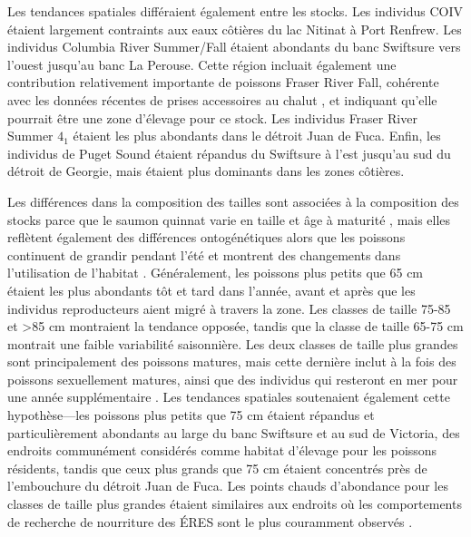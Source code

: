 Les tendances spatiales différaient également entre les stocks. Les individus COIV étaient largement contraints aux eaux côtières du lac Nitinat à Port Renfrew. Les individus Columbia River Summer/Fall étaient abondants du banc Swiftsure vers l'ouest jusqu'au banc La Perouse. Cette région incluait également une contribution relativement importante de poissons Fraser River Fall, cohérente avec les données récentes de prises accessoires au chalut \citep{lagasseReviewSalmonBycatch2024}, et indiquant qu'elle pourrait être une zone d'élevage pour ce stock. Les individus Fraser River Summer $4_1$ étaient les plus abondants dans le détroit Juan de Fuca. Enfin, les individus de Puget Sound étaient répandus du Swiftsure à l'est jusqu'au sud du détroit de Georgie, mais étaient plus dominants dans les zones côtières.

Les différences dans la composition des tailles sont associées à la composition des stocks parce que le saumon quinnat varie en taille et âge à maturité \citep{healeyLifeHistoryChinook1991}, mais elles reflètent également des différences ontogénétiques alors que les poissons continuent de grandir pendant l'été et montrent des changements dans l'utilisation de l'habitat \citep{freshwaterChinookSalmonDepth2024, freshwaterSeasonalVariabilityCondition2024}. Généralement, les poissons plus petits que 65 cm étaient les plus abondants tôt et tard dans l'année, avant et après que les individus reproducteurs aient migré à travers la zone. Les classes de taille 75-85 et >85 cm montraient la tendance opposée, tandis que la classe de taille 65-75 cm montrait une faible variabilité saisonnière. Les deux classes de taille plus grandes sont principalement des poissons matures, mais cette dernière inclut à la fois des poissons sexuellement matures, ainsi que des individus qui resteront en mer pour une année supplémentaire \citep{freshwaterChinookSalmonDepth2024, freshwaterSeasonalVariabilityCondition2024}. Les tendances spatiales soutenaient également cette hypothèse---les poissons plus petits que 75 cm étaient répandus et particulièrement abondants au large du banc Swiftsure et au sud de Victoria, des endroits communément considérés comme habitat d'élevage pour les poissons résidents, tandis que ceux plus grands que 75 cm étaient concentrés près de l'embouchure du détroit Juan de Fuca. Les points chauds d'abondance pour les classes de taille plus grandes étaient similaires aux endroits où les comportements de recherche de nourriture des ÉRES sont le plus couramment observés \citep{thorntonSouthernResidentKiller2022}.


